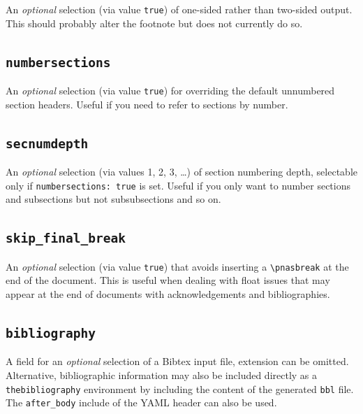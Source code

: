 \documentclass[letterpaper,9pt,twocolumn,twoside,]{pinp}
\begin{document}
An \emph{optional} selection (via value \texttt{true}) of one-sided
rather than two-sided output. This should probably alter the footnote
but does not currently do so.

\hypertarget{numbersections}{%
\subsection{\texorpdfstring{\texttt{numbersections}}{numbersections}}\label{numbersections}}

An \emph{optional} selection (via value \texttt{true}) for overriding
the default unnumbered section headers. Useful if you need to refer to
sections by number.

\hypertarget{secnumdepth}{%
\subsection{\texorpdfstring{\texttt{secnumdepth}}{secnumdepth}}\label{secnumdepth}}

An \emph{optional} selection (via values 1, 2, 3, \ldots{}) of section
numbering depth, selectable only if \texttt{numbersections:\ true} is
set. Useful if you only want to number sections and subsections but not
subsubsections and so on.

\hypertarget{skip_final_break}{%
\subsection{\texorpdfstring{\texttt{skip\_final\_break}}{skip\_final\_break}}\label{skip_final_break}}

An \emph{optional} selection (via value \texttt{true}) that avoids
inserting a \texttt{\textbackslash{}pnasbreak} at the end of the
document. This is useful when dealing with float issues that may appear
at the end of documents with acknowledgements and bibliographies.

\hypertarget{bibliography}{%
\subsection{\texorpdfstring{\texttt{bibliography}}{bibliography}}\label{bibliography}}

A field for an \emph{optional} selection of a Bibtex input file,
extension can be omitted. Alternative, bibliographic information may
also be included directly as a \texttt{thebibliography} environment by
including the content of the generated \texttt{bbl} file. The
\texttt{after\_body} include of the YAML header can also be used.
\end{document}

